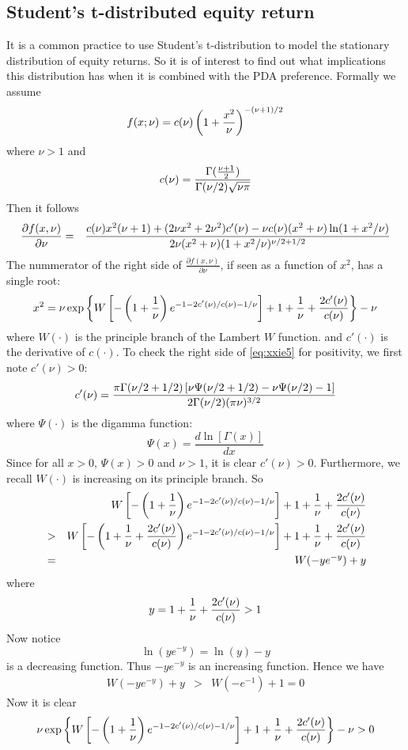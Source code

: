 \documentclass{article}
\newcommand{\td}[2]{
  \frac{d #1}{d #2}
}
\newcommand{\pd}[2]{
  \frac{\partial #1}{\partial #2}
}
\newcommand{\1}[1]{
  \mathbf{1}_{\{#1\}}
}
\begin{document}
\subsection{Student's t-distributed equity return}
It is a common practice to use Student's t-distribution to model the
stationary distribution of equity returns. So it is of interest to
find out what implications this distribution has when it is combined
with the PDA preference. Formally we assume
\[
f(x; \nu) = c(\nu) \left(
  1 + {x^2 \over \nu}
\right)^{-(\nu + 1)/2}
\]
where $\nu > 1$ and
\[
c(\nu) = {
  \Gamma({\nu + 1 \over 2})
  \over
  \Gamma(\nu/2) \sqrt{\nu \pi}
}
\]
Then it follows
\begin{eqnarray*}
\pd{f(x, \nu)}{\nu} &=& {
  c(\nu) x^2 (\nu + 1) + (2 \nu x^2 + 2 \nu^2) c'(\nu)
  -
  \nu c(\nu) (x^2 + \nu) \ln(1 + x^2/\nu)
  \over
  2 \nu (x^2 + \nu) (1 + x^2 / \nu)^{\nu/2 + 1/2}
}
\end{eqnarray*}
The nummerator of the right side of $\pd{f(x, \nu)}{\nu}$, if seen as
a function of $x^2$, has a single root:
\begin{equation}
  \label{eq:xxie5}
  x^2 = \nu\exp\left\{
    W\left[
      -\left(1 + {1 \over \nu}\right)
      e^{-1 - 2 c'(\nu)/c(\nu) - 1/\nu}
    \right]
    + 1 + {1 \over \nu} + {2 c'(\nu) \over c(\nu)}
  \right\} - \nu
\end{equation}
where $W(\cdot)$ is the principle branch of the Lambert $W$
function. and $c'(\cdot)$ is the derivative of $c(\cdot)$. To check
the right side of \eqref{eq:xxie5} for positivity, we first note
$c'(\nu) > 0$:
\[
c'(\nu) = {
  \pi \Gamma(\nu/2 + 1/2) \left[
    \nu \Psi(\nu/2 + 1/2) - \nu \Psi(\nu/2) - 1
  \right]
  \over
  2 \Gamma(\nu/2) (\pi \nu)^{3/2}
}
\]
where $\Psi(\cdot)$ is the digamma function:
\[
\Psi(x) = \td{\ln[\Gamma(x)]}{x}
\]
Since for all $x > 0$, $\Psi(x) > 0$ and $\nu > 1$, it is clear
$c'(\nu) > 0$. Furthermore, we recall
$W(\cdot)$ is increasing on its principle branch. So
\begin{eqnarray*}
  &&
  W\left[
    -\left( 1 + {1 \over \nu} \right)
    e^{-1 - 2 c'(\nu)/c(\nu) - 1/\nu}
  \right]
  + 1 + {1 \over \nu} + {2 c'(\nu) \over c(\nu)} \\
  &>& 
  W\left[
    -\left( 1 + {1 \over \nu} + {2 c'(\nu) \over c(\nu)} \right)
    e^{-1 - 2 c'(\nu)/c(\nu) - 1/\nu}
  \right]
  + 1 + {1 \over \nu} + {2 c'(\nu) \over c(\nu)} \\
  &=& W(-y e^{-y}) + y
\end{eqnarray*}
where
\[
y = 1 + {1 \over \nu} + {2 c'(\nu) \over c(\nu)} > 1
\]
Now notice
\[
\ln(y e^{-y}) = \ln(y) - y
\]
is a decreasing function. Thus $-y e^{-y}$ is an increasing
function. Hence we have
\begin{eqnarray*}
  W(-y e^{-y}) + y &>& W(-e^{-1}) + 1 = 0
\end{eqnarray*}
Now it is clear
\[
\nu\exp\left\{
    W\left[
      -\left(1 + {1 \over \nu}\right)
      e^{-1 - 2 c'(\nu)/c(\nu) - 1/\nu}
    \right]
    + 1 + {1 \over \nu} + {2 c'(\nu) \over c(\nu)}
  \right\} - \nu > 0
\]
\end{document}
